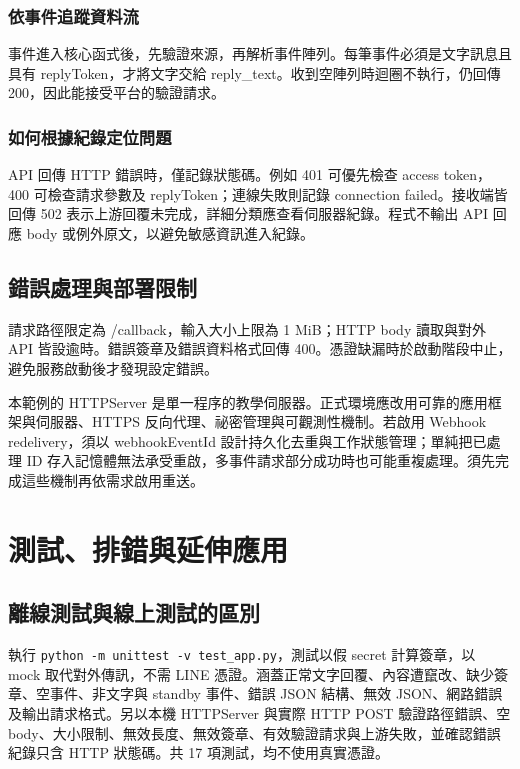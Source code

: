\documentclass[12pt,a4paper]{report}
\begin{document}
\subsection{依事件追蹤資料流}
事件進入核心函式後，先驗證來源，再解析事件陣列。每筆事件必須是文字訊息且具有 replyToken，才將文字交給 reply\_text。收到空陣列時迴圈不執行，仍回傳 200，因此能接受平台的驗證請求。
\subsection{如何根據紀錄定位問題}
API 回傳 HTTP 錯誤時，僅記錄狀態碼。例如 401 可優先檢查 access token，400 可檢查請求參數及 replyToken；連線失敗則記錄 connection failed。接收端皆回傳 502 表示上游回覆未完成，詳細分類應查看伺服器紀錄。程式不輸出 API 回應 body 或例外原文，以避免敏感資訊進入紀錄。

\section{錯誤處理與部署限制}
請求路徑限定為 /callback，輸入大小上限為 1 MiB；HTTP body 讀取與對外 API 皆設逾時。錯誤簽章及錯誤資料格式回傳 400。憑證缺漏時於啟動階段中止，避免服務啟動後才發現設定錯誤。

本範例的 HTTPServer 是單一程序的教學伺服器。正式環境應改用可靠的應用框架與伺服器、HTTPS 反向代理、祕密管理與可觀測性機制。若啟用 Webhook redelivery，須以 webhookEventId 設計持久化去重與工作狀態管理；單純把已處理 ID 存入記憶體無法承受重啟，多事件請求部分成功時也可能重複處理。須先完成這些機制再依需求啟用重送。
\clearpage
\chapter{測試、排錯與延伸應用}
\section{離線測試與線上測試的區別}
執行 \texttt{python -m unittest -v test\_app.py}，測試以假 secret 計算簽章，以 mock 取代對外傳訊，不需 LINE 憑證。涵蓋正常文字回覆、內容遭竄改、缺少簽章、空事件、非文字與 standby 事件、錯誤 JSON 結構、無效 JSON、網路錯誤及輸出請求格式。另以本機 HTTPServer 與實際 HTTP POST 驗證路徑錯誤、空 body、大小限制、無效長度、無效簽章、有效驗證請求與上游失敗，並確認錯誤紀錄只含 HTTP 狀態碼。共 17 項測試，均不使用真實憑證。
\end{document}
